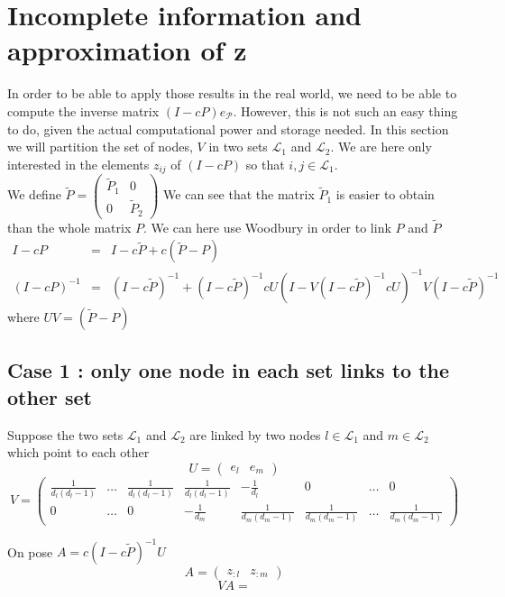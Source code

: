 \documentclass{article}
\newcommand{\1}{\mathbf{1}}
\theoremstyle{definition}
\begin{document}
\section{Incomplete information and approximation of z}
In order to be able to apply those results in the real world, we need to be able to compute the inverse matrix $(I-cP)e_{\mathcal{P}}$. However, this is not such an easy thing to do, given the actual computational power and storage needed. In this section we will partition the set of nodes, $V$ in two sets $\mathcal{L}_1$ and $\mathcal{L}_2$. We are here only interested in the elements $z_{ij}$ of $(I-cP)$ so that $i,j \in \mathcal{L}_1$. \\
We define $\tilde{P} = \begin{pmatrix}\tilde{P}_1 & 0 \\
0 & \tilde{P}_2 \end{pmatrix}
$
We can see that the matrix $\tilde{P}_1$ is easier to obtain than the whole matrix $P$.
We can here use Woodbury in order to link $P$ and $\tilde{P}$
\begin{eqnarray*}
I-cP & = & I-c\tilde{P} + c(\tilde{P}-P) \\
(I-cP)^{-1} & = & (I-c\tilde{P})^{-1} + (I-c\tilde{P})^{-1}cU(I-V(I-c\tilde{P})^{-1}cU)^{-1}V(I-c\tilde{P})^{-1}
\end{eqnarray*}
where $UV = (\tilde{P}-P)$ 
\subsection{Case 1 : only one node in each set links to the other set}
Suppose the two sets $\mathcal{L}_1$ and $\mathcal{L}_2$ are linked by two nodes $l\in \mathcal{L}_1$ and $m \in \mathcal{L}_2$ which point to each other
$$U = \begin{pmatrix}
e_{l}  & e_{m} \end{pmatrix}$$
$$V = \begin{pmatrix}
\frac{1}{d_{l}(d_{l}-1)} & \hdots & \frac{1}{d_{l}(d_{l}-1)} & \frac{1}{d_{l}(d_{l}-1)} & -\frac{1}{d_l} & 0 & \hdots & 0 \\
0 &\hdots & 0 & -\frac{1}{d_m} & \frac{1}{d_{m}(d_{m}-1)} & \frac{1}{d_{m}(d_{m}-1)} & \hdots & \frac{1}{d_{m}(d_{m}-1)}\end{pmatrix}$$

On pose $A = c(I-c\tilde{P})^{-1}U$
$$ A = \begin{pmatrix}
z_{:l} & z_{:m} 
\end{pmatrix}$$
$$VA = $$
 




\end{document}
